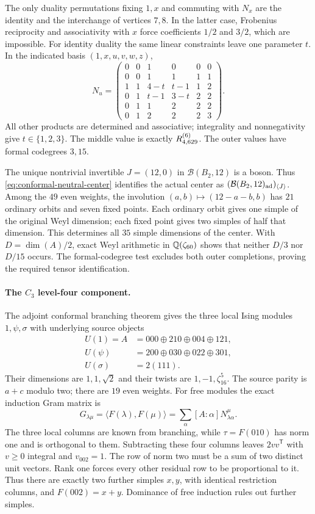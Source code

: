 The only duality permutations fixing $1,x$ and commuting with $N_x$
are the identity and the interchange of vertices $7,8$. In the latter
case, Frobenius reciprocity and associativity with $x$ force coefficients
$1/2$ and $3/2$, which are impossible. For identity duality the same
linear constraints leave one parameter $t$. In the indicated basis
$(1,x,u,v,w,z)$,
\[
 N_u=\begin{pmatrix}
 0&0&1&0&0&0\\
 0&0&1&1&1&1\\
 1&1&4-t&t-1&1&2\\
 0&1&t-1&3-t&2&2\\
 0&1&1&2&2&2\\
 0&1&2&2&2&3
 \end{pmatrix}.
\]
All other products are determined and associative; integrality and
nonnegativity give $t\in\{1,2,3\}$. The middle value is exactly
$R^{(6)}_{4,629}$. The outer values have formal codegrees $3,15$.

The unique nontrivial invertible $J=(12,0)$ in $\mathcal B(B_2,12)$
is a boson. Thus \eqref{eq:conformal-neutral-center} identifies the
actual center as $(\mathcal B(B_2,12)_{\rm ad})_{\langle J\rangle}$.
Among the $49$ even weights, the involution
$(a,b)\mapsto(12-a-b,b)$ has $21$ ordinary orbits and seven fixed
points. Each ordinary orbit gives one simple of the original Weyl
dimension; each fixed point gives two simples of half that dimension.
This determines all $35$ simple dimensions of the center. With
$D=\dim(A)/2$, exact Weyl arithmetic in $\mathbb Q(\zeta_{60})$ shows that
neither $D/3$ nor $D/15$ occurs. The formal-codegree test excludes both
outer completions, proving the required tensor identification.

\paragraph{The $C_3$ level-four component.}
The adjoint conformal branching theorem
\cite[Theorem~3.9 and Proposition~4.1]{CKMP} gives the three local
Ising modules $1,\psi,\sigma$ with underlying source objects
\begin{align*}
 U(1)=A&=000\oplus210\oplus004\oplus121,\\
 U(\psi)&=200\oplus030\oplus022\oplus301,\\
 U(\sigma)&=2(111).
\end{align*}
Their dimensions are $1,1,\sqrt2$ and their twists are
$1,-1,\zeta_{16}^{5}$. The source parity is $a+c$ modulo two;
there are $19$ even weights.
For free modules the exact induction Gram matrix is
\[
 G_{\lambda\mu}=\langle F(\lambda),F(\mu)\rangle
      =\sum_\alpha[A:\alpha]N_{\lambda\alpha}^{\mu}.
\]
The three local columns are known from branching, while
$\tau=F(010)$ has norm one and is orthogonal to them. Subtracting these
four columns leaves $2vv^{\mathsf T}$ with $v\ge0$ integral and
$v_{002}=1$. The row of norm two must be a sum of two distinct unit
vectors. Rank one forces every other residual row to be proportional
to it. Thus there are exactly two further simples $x,y$, with identical
restriction columns, and $F(002)=x+y$.
Dominance of free induction rules out further simples.

